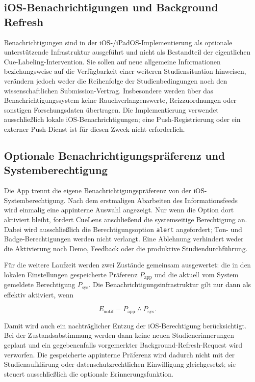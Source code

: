 
\begin{neu}
\section{iOS-Benachrichtigungen und Background Refresh}

Benachrichtigungen sind in der iOS-/iPadOS-Implementierung als optionale unterstützende Infrastruktur ausgeführt und nicht als Bestandteil der eigentlichen Cue-Labeling-Intervention. Sie sollen auf neue allgemeine Informationen beziehungsweise auf die Verfügbarkeit einer weiteren Studiensituation hinweisen, verändern jedoch weder die Reihenfolge der Studienbedingungen noch den wissenschaftlichen Submission-Vertrag. Insbesondere werden über das Benachrichtigungssystem keine Rauchverlangenswerte, Reizzuordnungen oder sonstigen Forschungsdaten übertragen. Die Implementierung verwendet ausschließlich lokale iOS-Benachrichtigungen; eine Push-Registrierung oder ein externer Push-Dienst ist für diesen Zweck nicht erforderlich.

\subsection{Optionale Benachrichtigungspräferenz und Systemberechtigung}

Die App trennt die eigene Benachrichtigungspräferenz von der iOS-Systemberechtigung. Nach dem erstmaligen Abarbeiten des Informationsfeeds wird einmalig eine appinterne Auswahl angezeigt. Nur wenn die Option dort aktiviert bleibt, fordert CueLens anschließend die systemseitige Berechtigung an. Dabei wird ausschließlich die Berechtigungsoption \texttt{alert} angefordert; Ton- und Badge-Berechtigungen werden nicht verlangt. Eine Ablehnung verhindert weder die Aktivierung noch Demo, Feedback oder die produktive Studiendurchführung.

Für die weitere Laufzeit werden zwei Zustände gemeinsam ausgewertet: die in den lokalen Einstellungen gespeicherte Präferenz \(P_{\mathrm{app}}\) und die aktuell vom System gemeldete Berechtigung \(P_{\mathrm{sys}}\). Die Benachrichtigungsinfrastruktur gilt nur dann als effektiv aktiviert, wenn

\[
E_{\mathrm{notif}} = P_{\mathrm{app}} \land P_{\mathrm{sys}}.
\]

Damit wird auch ein nachträglicher Entzug der iOS-Berechtigung berücksichtigt. Bei der Zustandsabstimmung werden dann keine neuen Studienerinnerungen geplant und ein gegebenenfalls vorgemerkter Background-Refresh-Request wird verworfen. Die gespeicherte appinterne Präferenz wird dadurch nicht mit der Studienaufklärung oder datenschutzrechtlichen Einwilligung gleichgesetzt; sie steuert ausschließlich die optionale Erinnerungsfunktion.


\end{neu}
